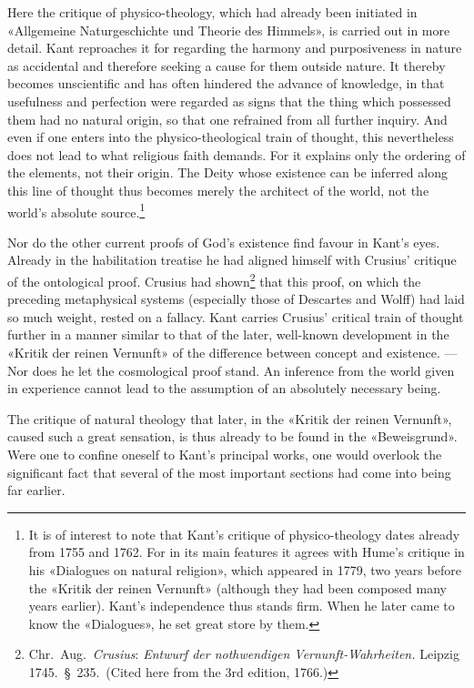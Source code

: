 \documentclass[12pt,a4paper]{article}
\newcommand{\opage}[1]{\marginnote{\footnotesize\textit{[#1]}}}
\begin{document}
Here the critique of
physico-theology, which had already been initiated in «Allgemeine
Naturgeschichte und Theorie des Himmels», is carried out in more detail.
Kant reproaches it for regarding the harmony and purposiveness in nature
as accidental and therefore seeking a cause for them outside nature. It
thereby becomes unscientific and has often hindered the advance of
knowledge, in that usefulness and perfection were regarded as signs that
the thing which possessed them had no natural origin, so that one
refrained from all further inquiry. And even if one enters into the
physico-theological train of thought, this nevertheless does not lead to
what religious faith demands. For it explains only the ordering of the
elements, not their origin. The Deity whose existence can be inferred
along this line of thought thus becomes merely the architect of the world,
not the world's absolute source.\footnote{It is of interest to note that
Kant's critique of physico-theology dates already from 1755 and 1762. For
in its main features it agrees with Hume's critique in his «Dialogues on
natural religion», which appeared in 1779, two years before the «Kritik
der reinen Vernunft» (although they had been composed many years earlier).
Kant's independence thus stands firm. When he later came to know the
«Dialogues», he set great store by them.}

\opage{12}Nor do the other current proofs of God's existence find favour in Kant's
eyes. Already in the habilitation treatise he had aligned himself with
Crusius' critique of the ontological proof. Crusius had
shown\footnote{Chr.\ Aug.\ \emph{Crusius}: \textit{Entwurf der nothwendigen
Vernunft-Wahrheiten.} Leipzig 1745.\ §\ 235.\ (Cited here from the 3rd
edition, 1766.)} that this proof, on which the preceding metaphysical
systems (especially those of Descartes and Wolff) had laid so much weight,
rested on a fallacy. Kant carries Crusius' critical train of thought
further in a manner similar to that of the later, well-known development
in the «Kritik der reinen Vernunft» of the difference between concept and
existence. --- Nor does he let the cosmological proof stand. An inference
from the world given in experience cannot lead to the assumption of an
absolutely necessary being.

The critique of natural theology that later, in the «Kritik der reinen
Vernunft», caused such a great sensation, is thus already to be found in
the «Beweisgrund». Were one to confine oneself to Kant's principal works,
one would overlook the significant fact that several of the most important
sections had come into being far earlier.
\end{document}
